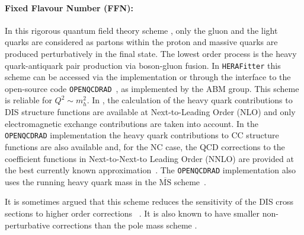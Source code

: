 \paragraph{Fixed Flavour Number (FFN)\rm:\\} 
In this rigorous quantum field theory scheme \cite{Laenen:1992, Laenen:1993, Riem:1995}, 
only the gluon and the light quarks are considered
as partons within the proton and massive 
quarks are produced perturbatively in the final state.
The lowest order process is
the heavy quark-antiquark pair production via boson-gluon fusion.
In \texttt{HERA}\texttt{Fitter} this scheme can be accessed via the 
\qcdnum implementation or through the interface to the open-source code \texttt{OPENQCDRAD}~\cite{openqcdrad:page}, as implemented by the ABM group.
This scheme is reliable for $Q^2 \sim m_h^2$.
In \qcdnum, the calculation of the heavy quark contributions to DIS structure functions
are available at Next-to-Leading Order (NLO) and only electromagnetic exchange contributions are taken into account. 
In the \texttt{OPEN}\texttt{QCDRAD} implementation the heavy quark contributions to CC structure functions are also available 
and, for the NC case, the QCD corrections to the coefficient functions in Next-to-Next-to Leading Order (NNLO)
are provided at the best currently known approximation~\cite{SMoch:npb864}.
The  \texttt{OPENQCDRAD} implementation also uses the running heavy quark mass in the $\overline{\text{MS}}$ scheme~\cite{Alekhin:runm}.

It is sometimes argued that this scheme reduces the sensitivity of the DIS cross sections to higher order corrections ~\cite{SMoch:npb864}. It is also known to have smaller non-perturbative corrections than the pole mass scheme 
\cite{Beneke:1998ui}.

